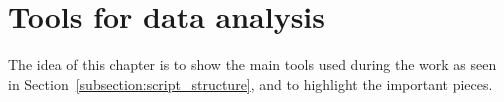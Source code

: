 \chapter{Tools for data analysis}
The idea of this chapter is to show the main tools used during the work as seen in Section~\ref{subsection:script_structure}, and to highlight the important pieces.





